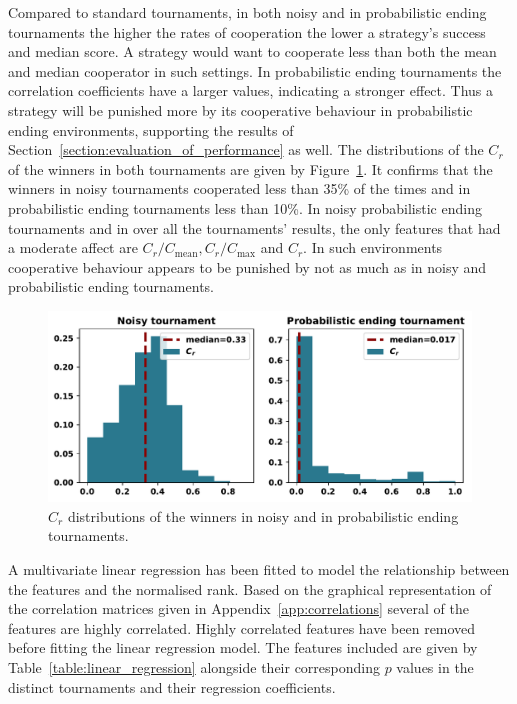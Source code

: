 \documentclass{article}
\begin{document}
Compared to standard tournaments, in both noisy and in probabilistic ending
tournaments the higher the rates of cooperation the lower a strategy's success
and median score. A strategy would want to cooperate less than both
the mean and median cooperator in such settings. In probabilistic ending
tournaments the correlation coefficients have a larger values, indicating a
stronger effect. Thus a strategy will be punished more by its cooperative
behaviour in probabilistic ending environments, supporting the results of Section~\ref{section:evaluation_of_performance}
as well. The distributions of the $C_r$ of the winners in
both tournaments are given by Figure~\ref{fig:c_r_distributions}. It confirms
that the winners in noisy tournaments cooperated less than 35\% of the times
and in probabilistic ending tournaments less than 10\%.
In noisy probabilistic ending tournaments and in over all the tournaments' results,
the only features that had a moderate affect are $C_r/C_{\text{mean}},
C_r/C_{\text{max}}$ and $C_r$. In such environments cooperative behaviour
appears to be punished by not as much as in noisy and probabilistic ending
tournaments.

\begin{figure}[!htbp]
    \centering
    \includegraphics[width=.57\textwidth]{../images/c_r_winners_tournaments.pdf}
    \caption{$C_r$ distributions of the winners in noisy and in probabilistic
    ending tournaments.}\label{fig:c_r_distributions}
\end{figure}

A multivariate linear regression has been fitted to model the relationship between
the features and the normalised rank. Based on the graphical representation of
the correlation matrices given in Appendix~\ref{app:correlations} several of the
features are highly correlated. Highly correlated features have been removed
before fitting the linear regression model. The features included are given
by Table~\ref{table:linear_regression} alongside their corresponding \(p\) values
in the distinct tournaments and their regression coefficients.

\begin{table}[h]
    \begin{center}
\resizebox{.8\textwidth}{!}{
    }
    \end{center}
    \caption{Results of multivariate linear regressions with \(r\) as the depended variable.
    \(R\) square is reported for each model. An \(R\) square of 1 represents a model
    that explains all of the variation in the response variable around its mean.}
    \label{table:linear_regression}
\end{table}
\end{document}
